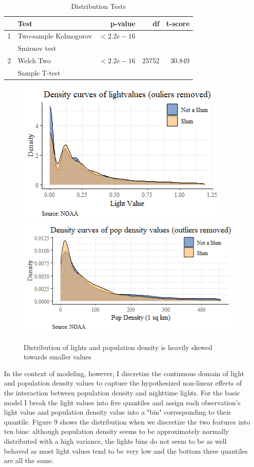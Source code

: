 \begin{table}[ht]
\centering
\caption{Distribution Tests}
\begin{tabular}{rlrrr}
  \hline \hline
 & Test & p-value & df & t-score \\ 
  \hline
1 & Two-sample Kolmogorov  & $<2.2e-16$ &  &   \\
 & Smirnov test & & &  \\
 \hline
  2 & Welch Two & $< 2.2e-16$ & 25752 & 30.849 \\
   & Sample T-test & & & \\
   \hline
\end{tabular}
\end{table}


\begin{figure}
    \centering
    \includegraphics[scale = 0.7]{Graphics/Light Value density curve.png}
    \includegraphics[scale = 0.75]{Graphics/Pop Density density curve.png}
    \caption{Distribution of lights and population density is heavily skewed towards smaller values}
    \label{fig:densitycurves}
\end{figure}

In the context of modeling, however, I discretize the continuous domain of light and population density values to capture the hypothesized non-linear effects of the interaction between population density and nighttime lights. For the basic model I break the light values into five quantiles and assign each observation's light value and population density value into a "bin" corresponding to their quantile. Figure 9 shows the distribution when we discretize the two features into ten bins: although population density seems to be approximately normally distributed with a high variance, the lights bins do not seem to be as well behaved as most light values tend to be very low and the bottom three quantiles are all the same.

